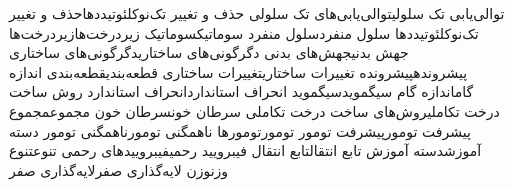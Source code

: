 {توالی‌یابی تک سلولی}{توالی‌یابی‌های تک سلولی}
{حذف و تغییر تک‌نوکلئوتیددها}{حذف و تغییر تک‌نوکلئوتیددها}
{سلول منفرد}{سلول منفرد}
{سوماتیک}{سوماتیک}
{زیردرخت‌ها}{زیردرخت‌ها}
{جهش بدنی}{جهش‌های بدنی}
{دگرگونی‌های ساختاری}{دگرگونی‌های ساختاری}
{پیشرونده}{پیشرونده}
{تغییرات ساختاری}{تغییرات ساختاری}
{قطعه‌‌بندی}{قطعه‌بندی}
{اندازه گام}{اندازه گام}
{سیگموید}{سیگموید}
{انحراف استاندارد}{انحراف استاندارد}
{روش ساخت درخت تکاملی}{روش‌های ساخت درخت تکاملی}
{سرطان خون}{سرطان خون}
{مجموع}{مجموع}
{پیشرفت تومور}{پیشرفت تومور}
{تومور}{تومورها}
{ناهمگنی تومور}{ناهمگنی تومور}
{دسته آموزش}{دسته آموزش}
{تابع انتقال}{تابع انتقال}
{فیبرویید رحمی}{فیبروییدهای رحمی}
{تنوع}{تنوع}
{وزن}{وزن}
{لایه‌گذاری صفر}{لایه‌گذاری صفر}
